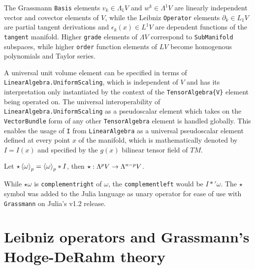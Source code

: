 \documentclass[]{article}
\begin{document}
The Grassmann \verb`Basis` elements $v_k\in\Lambda_1V$ and $w^k\in\Lambda^1V$ are linearly independent vector and covector elements of $V$, while the Leibniz \verb`Operator` elements $\partial_k\in L_1V$ are partial tangent derivations and $\epsilon_k(x)\in L^1V$ are dependent functions of the \verb`tangent` manifold. 
Higher \verb`grade` elements of $\Lambda V$ correspond to \verb`SubManifold` subspaces, while higher \verb`order` function elements of $LV$ become homogenous polynomials and Taylor series.


A universal unit volume element can be specified in terms of \verb`LinearAlgebra.UniformScaling`, which is independent of $V$ and has its interpretation only instantiated by the context of the \verb`TensorAlgebra{V}` element being operated on.
The universal interoperability of \verb`LinearAlgebra.UniformScaling` as a pseudoscalar element which takes on the \verb`VectorBundle` form of any other \verb`TensorAlgebra` element is handled globally. 
This enables the usage of \verb`I` from \verb`LinearAlgebra` as a universal pseudoscalar element defined at every point $x$ of the manifold, which is mathematically denoted by $I=I(x)$ and specified by the $g(x)$ bilinear tensor field of $TM$.

\begin{definition}
	Let $\star\left\langle \omega \right\rangle_p = \left\langle \omega \right\rangle_p\ast I$, %
	 then $\star : \Lambda^pV\rightarrow\Lambda^{n-p}V$.
\end{definition}
\begin{remark}
	While $\star\omega$ is \verb`complementright` of $\omega$, the \verb`complementleft` would be $I\ast'\omega$. The $\star$ symbol was added to the Julia language as unary operator for ease of use with \verb`Grassmann` on Julia's v1.2 release.
\end{remark}

\section{Leibniz operators and Grassmann's Hodge-DeRahm theory}
\end{document}
